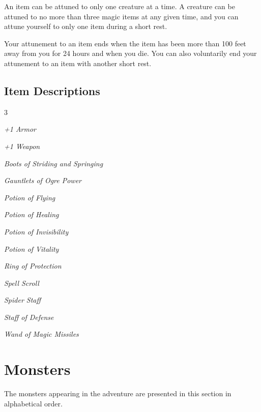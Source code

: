\documentclass[10pt,a4paper,twoside,bg=print,twocolumn,openany,nodeprecatedcode]{dndbook}
\begin{document}
An item can be attuned to only one creature at a time. A creature can be attuned to no more than three magic items at any given time, and you can attune yourself to only one item during a short rest.

Your attunement to an item ends when the item has been more than 100 feet away from you for 24 hours and when you die. You can also voluntarily end your attunement to an item with another short rest.

\section{Item Descriptions}

\begin{itemize}
\begin{multicols}{3}
\item \textit{+1 Armor}
\item \textit{+1 Weapon}
\item \textit{Boots of Striding and Springing}
\item \textit{Gauntlets of Ogre Power}
\item \textit{Potion of Flying}
\item \textit{Potion of Healing}
\item \textit{Potion of Invisibility}
\item \textit{Potion of Vitality}
\item \textit{Ring of Protection}
\item \textit{Spell Scroll}
\item \textit{Spider Staff}
\item \textit{Staff of Defense}
\item \textit{Wand of Magic Missiles}
\end{multicols}

\end{itemize}

\chapter{Monsters}
The monsters appearing in the adventure are presented in this section in alphabetical order.
\end{document}
